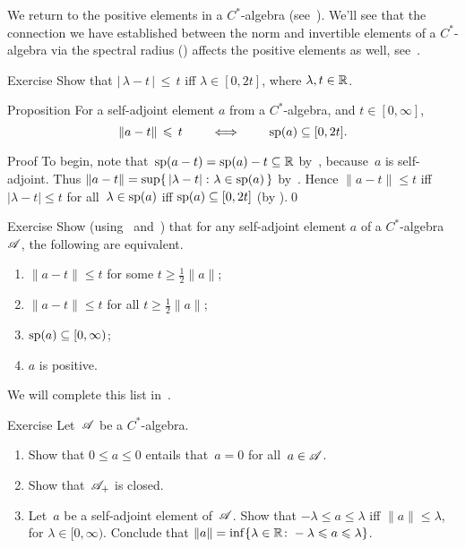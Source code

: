 \documentclass[a]{subfiles}
\begin{document}
\begin{parsec}%
\begin{point}%
We return to the positive elements 
in a $C^*$-algebra (see~).
We'll see that the connection we have established
between the norm and invertible elements
of a $C^*$-algebra
via the spectral radius ()
affects the positive elements as well, see~.
\end{point}
\begin{point}{Exercise}%
Show that 
$\left|\,\lambda-t\,\right| \,\leq\, t$ iff  $\lambda \in[0,2t]$,
where $\lambda,t\in\mathbb{R}$.
\end{point}
\begin{point}{Proposition}%
For a self-adjoint element $a$ from a $C^*$-algebra,
and $t\in [0,\infty]$, 
\begin{equation*}
\|a-t\|\,\leqslant\, t\qquad\iff\qquad \mathrm{sp}(a)\subseteq [0,2t].
\end{equation*}%
\begin{point}{Proof}%
To begin, note that~$\mathrm{sp}(a-t)=\mathrm{sp}(a)-t\subseteq \mathbb{R}$ 
by~,
because~$a$ is self-adjoint.
Thus $\|a-t\|=\sup\{\,\left|\lambda-t\right|\colon \lambda\in \mathrm{sp}(a)\,\}$
by~.
Hence $\|a-t\|\leq t$
iff $\left|\lambda-t\right|\leq t$ for all~$\lambda\in\mathrm{sp}(a)$
iff $\mathrm{sp}(a)\subseteq [0,2t]$ (by ).\qed
\end{point}
\end{point}
\begin{point}{Exercise}%
%
Show
(using~ and~)
that
for any self-adjoint element $a$ of a $C^*$-algebra~$\mathscr{A}$,
the following are equivalent.
\begin{enumerate}
\item 
\label{cstar-pos-1}
$\|a-t\|\leq t$
for some $t\geq \frac{1}{2}\|a\|$;
\item 
\label{cstar-pos-2}
$\|a-t\|\leq t$
for all $t\geq \frac{1}{2}\|a\|$;
\item 
\label{cstar-pos-3}
$\mathrm{sp}(a)\subseteq[0,\infty)$;
\item
$a$ is positive.
\end{enumerate}
We will complete this list in~.
\end{point}
\begin{point}{Exercise}%
Let~$\mathscr{A}$ be a $C^*$-algebra.
\begin{enumerate}
\item
Show that $0\leq a\leq 0$ entails that~$a=0$
for all~$a\in\mathscr{A}$.
\item
Show that~$\mathscr{A}_{+}$ is closed.
\item
Let~$a$ be a self-adjoint element of~$\mathscr{A}$.
Show that
 $-\lambda \leq a\leq \lambda$
iff $\|a\|\leq \lambda$,
for $\lambda\in [0,\infty)$.
Conclude that $\|a\| = \inf\{ \lambda \in \mathbb{R}\colon 
-\lambda \leqslant a\leqslant \lambda\}$.


\end{enumerate}
\end{point}
\end{parsec}
\end{document}
